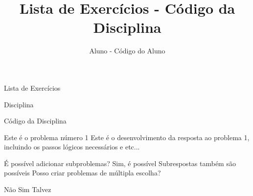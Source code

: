 \documentclass[12pt,a4paper]{article}
\author{Aluno - Código do Aluno}
\title{Lista de Exercícios - Código da Disciplina}
\date{}
\begin{document}
	\begin{center}
    {\huge Lista de Exercícios \par}
    {\LARGE Disciplina \par}
    {\Large Código da Disciplina \par}
	\end{center}

\problem Este é o problema número 1
\answer Este é o desenvolvimento da resposta ao problema 1, incluindo os passos lógicos necessários e etc...

\problem É possível adicionar subproblemas?
	\subproblem Sim, é possível
	\subanswer Subrespostas também são possíveis
\problem Posso criar problemas de múltipla escolha?
    
\begin{subitemize}
    \option Não
    \thisone Sim
    \option Talvez
\end{subitemize}
\end{document}
